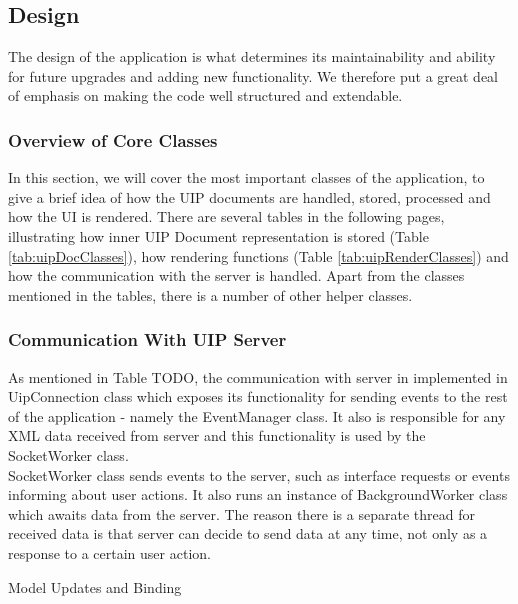 \subsection{Design}
The design of the application is what determines its maintainability and ability for future upgrades and adding new functionality. We therefore put a great deal of emphasis on making the code well structured and extendable.

\subsubsection{Overview of Core Classes}
In this section, we will cover the most important classes of the application, to give a brief idea of how the UIP documents are handled, stored, processed and how the UI is rendered. There are several tables in the following pages, illustrating how inner UIP Document representation is stored (Table \ref{tab:uipDocClasses}), how rendering functions (Table \ref{tab:uipRenderClasses}) and how the communication with the server is handled. Apart from the classes mentioned in the tables, there is a number of other helper classes.








\subsubsection{Communication With UIP Server}
As mentioned in Table TODO, the communication with server in implemented in UipConnection class which exposes its functionality for sending events to the rest of the application - namely the EventManager class. It also is responsible for any XML data received from server and this functionality is used by the SocketWorker class.
\\
SocketWorker class sends events to the server, such as interface requests or events informing about user actions. It also runs an instance of BackgroundWorker class which awaits data from the server. The reason there is a separate thread for received data is that server can decide to send data at any time, not only as a response to a certain user action.

Model Updates and Binding\\
